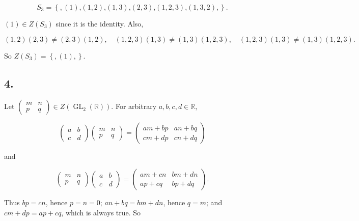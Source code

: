 \[S_{3} = \left\{ {,(1)\text{,}\left( {1,2} \right)\text{,}\left( {1,3} \right)\text{,}\left( {2,3} \right)\text{,}\left( {1,2,3} \right)\text{,}\left( {1,3,2} \right),} \right\}.\]

\((1) \in Z\left( S_{3} \right)\) since it is the identity. Also,

\[\left( {1,2} \right)\left( {2,3} \right) \neq \left( {2,3} \right)\left( {1,2} \right),\quad\left( {1,2,3} \right)\left( {1,3} \right) \neq \left( {1,3} \right)\left( {1,2,3} \right),\quad\left( {1,2,3} \right)\left( {1,3} \right) \neq \left( {1,3} \right)\left( {1,2,3} \right).\]

So \(Z\left( S_{3} \right) = \left\{ {,(1),} \right\}\).

\subsection{4.}

Let \(\begin{pmatrix}
m & n \\
p & q
\end{pmatrix} \in Z\left( {\operatorname{GL}_{2}\left( \mathbb{R} \right)} \right)\). For arbitrary \(a,b,c,d \in \mathbb{R}\),

\[\begin{pmatrix}
a & b \\
c & d
\end{pmatrix}\begin{pmatrix}
m & n \\
p & q
\end{pmatrix} = \begin{pmatrix}
{am + bp} & {an + bq} \\
{cm + dp} & {cn + dq}
\end{pmatrix}\]

and

\[\begin{pmatrix}
m & n \\
p & q
\end{pmatrix}\begin{pmatrix}
a & b \\
c & d
\end{pmatrix} = \begin{pmatrix}
{am + cn} & {bm + dn} \\
{ap + cq} & {bp + dq}
\end{pmatrix}.\]

Thus \(bp = cn\), hence \(p = n = 0\); \(an + bq = bm + dn\), hence \(q = m\); and \(cm + dp = ap + cq\), which is always true. So

